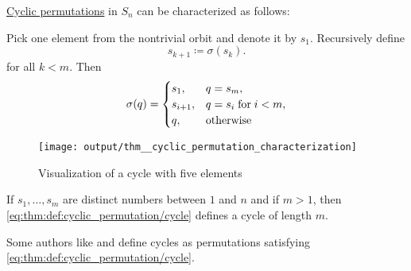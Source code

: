 \begin{proposition}\label{thm:cyclic_permutation_characterization}
  \hyperref[def:cyclic_permutation]{Cyclic permutations} in \( S_n \) can be characterized as follows:
  \begin{thmenum}
     Pick one element from the nontrivial orbit and denote it by \( s_1 \). Recursively define
    \begin{equation*}
      s_{k+1} \coloneqq \sigma(s_k).
    \end{equation*}
    for all \( k < m \). Then
    \begin{equation}\label{eq:thm:def:cyclic_permutation/cycle}
      \sigma(q) = \begin{cases}
        s_1,       &q = s_m, \\
        s_{i + 1}, &q = s_i \T{for} i < m, \\
        q,         &\T{otherwise}
      \end{cases}
    \end{equation}

    \begin{figure}
      \centering
      \texttt{[image: output/thm\_\_cyclic\_permutation\_characterization]}
      \caption{Visualization of a cycle with five elements}
      \label{fig:thm:cyclic_permutation_characterization}
    \end{figure}

     If \( s_1, \ldots, s_m \) are distinct numbers between \( 1 \) and \( n \) and if \( m > 1 \), then \cref{eq:thm:def:cyclic_permutation/cycle} defines a cycle of length \( m \).
  \end{thmenum}
\end{proposition}
\begin{comments}
  \item Some authors like  and  define cycles as permutations satisfying \cref{eq:thm:def:cyclic_permutation/cycle}.
\end{comments}
